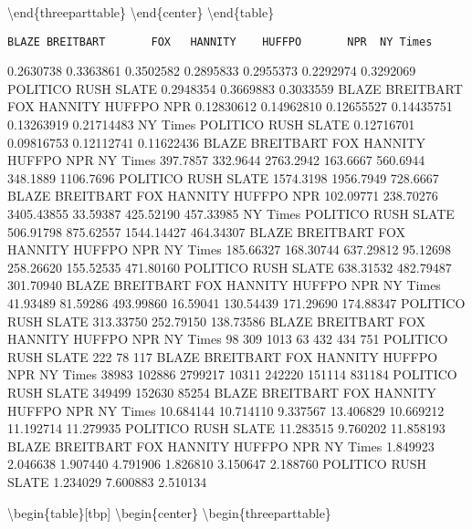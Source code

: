 \documentclass[english,,man]{apa6}
\begin{document}
\textbackslash{}end\{threeparttable\}
\textbackslash{}end\{center\}
\textbackslash{}end\{table\}

\begin{verbatim}
BLAZE BREITBART       FOX   HANNITY    HUFFPO       NPR  NY Times 
\end{verbatim}

0.2630738 0.3363861 0.3502582 0.2895833 0.2955373 0.2292974 0.3292069
POLITICO RUSH SLATE
0.2948354 0.3669883 0.3033559
BLAZE BREITBART FOX HANNITY HUFFPO NPR
0.12830612 0.14962810 0.12655527 0.14435751 0.13263919 0.21714483
NY Times POLITICO RUSH SLATE
0.12716701 0.09816753 0.12112741 0.11622436
BLAZE BREITBART FOX HANNITY HUFFPO NPR NY Times
397.7857 332.9644 2763.2942 163.6667 560.6944 348.1889 1106.7696
POLITICO RUSH SLATE
1574.3198 1956.7949 728.6667
BLAZE BREITBART FOX HANNITY HUFFPO NPR
102.09771 238.70276 3405.43855 33.59387 425.52190 457.33985
NY Times POLITICO RUSH SLATE
506.91798 875.62557 1544.14427 464.34307
BLAZE BREITBART FOX HANNITY HUFFPO NPR NY Times
185.66327 168.30744 637.29812 95.12698 258.26620 155.52535 471.80160
POLITICO RUSH SLATE
638.31532 482.79487 301.70940
BLAZE BREITBART FOX HANNITY HUFFPO NPR NY Times
41.93489 81.59286 493.99860 16.59041 130.54439 171.29690 174.88347
POLITICO RUSH SLATE
313.33750 252.79150 138.73586
BLAZE BREITBART FOX HANNITY HUFFPO NPR NY Times
98 309 1013 63 432 434 751
POLITICO RUSH SLATE
222 78 117
BLAZE BREITBART FOX HANNITY HUFFPO NPR NY Times
38983 102886 2799217 10311 242220 151114 831184
POLITICO RUSH SLATE
349499 152630 85254
BLAZE BREITBART FOX HANNITY HUFFPO NPR NY Times
10.684144 10.714110 9.337567 13.406829 10.669212 11.192714 11.279935
POLITICO RUSH SLATE
11.283515 9.760202 11.858193
BLAZE BREITBART FOX HANNITY HUFFPO NPR NY Times
1.849923 2.046638 1.907440 4.791906 1.826810 3.150647 2.188760
POLITICO RUSH SLATE
1.234029 7.600883 2.510134

\textbackslash{}begin\{table\}{[}tbp{]}
\textbackslash{}begin\{center\}
\textbackslash{}begin\{threeparttable\}

\caption{\label{tab:exp2sourcedescriptivesgs}}
\end{document}
